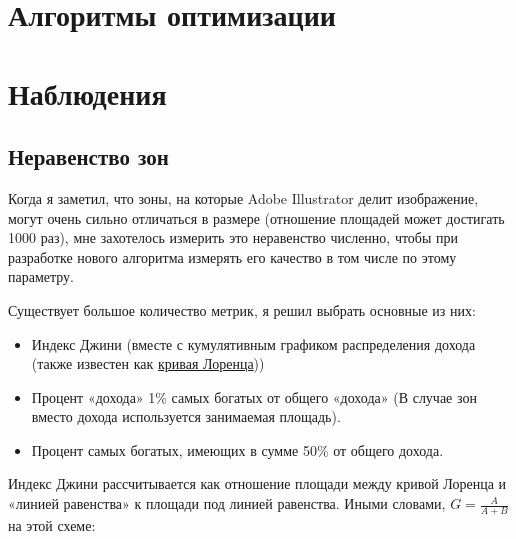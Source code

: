 \documentclass[11pt]{article}
\begin{document}
    \section {Алгоритмы оптимизации}\label{sec:opimization_algorithms}
    

    \section{Наблюдения}\label{sec:observations}

    \subsection{Неравенство зон}\label{subsec:inequality}
    Когда я заметил, что зоны, на которые Adobe Illustrator делит изображение, могут очень сильно отличаться в размере (отношение площадей может достигать 1000 раз),
    мне захотелось измерить это неравенство численно, чтобы при разработке нового алгоритма измерять его качество в том числе по этому параметру.

    Существует большое количество метрик, я решил выбрать основные из них:
    \begin{itemize}
        \item Индекс Джини (вместе с кумулятивным графиком распределения дохода (также известен как \href{https://en.wikipedia.org/wiki/Lorenz_curve}{кривая Лоренца}))
        \item Процент «дохода» 1\% самых богатых от общего «дохода» (В случае зон вместо дохода используется занимаемая площадь).
        \item Процент самых богатых, имеющих в сумме 50\% от общего дохода.
    \end{itemize}

    Индекс Джини рассчитывается как отношение площади между кривой Лоренца и «линией равенства» к площади под линией равенства.
    Иными словами, $G = \frac{A}{A + B}$ на этой схеме:
\end{document}
